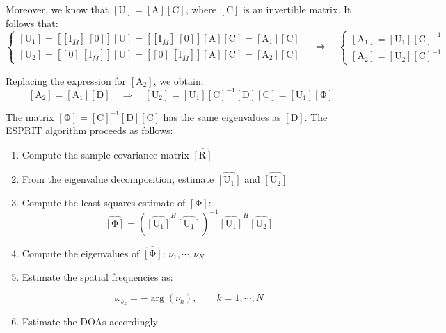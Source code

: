 Moreover, we know that $\left[ \mathrm{U} \right] = \left[ \mathrm{A} \right] \left[ \mathrm{C} \right]$, 
where $\left[ \mathrm{C} \right]$ is an invertible matrix.  
It follows that:
\[
\left\{
\begin{array}{l}
\left[ \mathrm{U}_1 \right] 
= \left[ \left[ \mathrm{I}_{\overline{M}} \right] \ \left[ 0 \right] \right] \left[ \mathrm{U} \right] 
= \left[ \left[ \mathrm{I}_{\overline{M}} \right] \ \left[ 0 \right] \right] \left[ \mathrm{A} \right] \left[ \mathrm{C} \right] 
= \left[ \mathrm{A}_1 \right] \left[ \mathrm{C} \right] \\
\left[ \mathrm{U}_2 \right] 
= \left[ \left[ 0 \right] \ \left[ \mathrm{I}_{\overline{M}} \right] \right] \left[ \mathrm{U} \right] 
= \left[ \left[ 0 \right] \ \left[ \mathrm{I}_{\overline{M}} \right] \right] \left[ \mathrm{A} \right] \left[ \mathrm{C} \right] 
= \left[ \mathrm{A}_2 \right] \left[ \mathrm{C} \right]
\end{array}
\right.
\quad \Rightarrow \quad
\left\{
\begin{array}{l}
\left[ \mathrm{A}_1 \right] = \left[ \mathrm{U}_1 \right] \left[ \mathrm{C} \right]^{-1} \\
\left[ \mathrm{A}_2 \right] = \left[ \mathrm{U}_2 \right] \left[ \mathrm{C} \right]^{-1}
\end{array}
\right.
\]

Replacing the expression for $\left[ \mathrm{A}_2 \right]$, we obtain:
\[
\left[ \mathrm{A}_2 \right] = \left[ \mathrm{A}_1 \right] \left[ \mathrm{D} \right]
\quad \Rightarrow \quad
\left[ \mathrm{U}_2 \right] 
= \left[ \mathrm{U}_1 \right] \left[ \mathrm{C} \right]^{-1} \left[ \mathrm{D} \right] \left[ \mathrm{C} \right] 
= \left[ \mathrm{U}_1 \right] \left[ \mathrm{\Phi} \right]
\]

The matrix $\left[ \mathrm{\Phi} \right] = \left[ \mathrm{C} \right]^{-1} \left[ \mathrm{D} \right] \left[ \mathrm{C} \right]$ has the same eigenvalues as $\left[ \mathrm{D} \right]$.
The ESPRIT algorithm proceeds as follows:
\begin{enumerate}
    \item Compute the sample covariance matrix $\hat{[ \mathrm{R} ]}$
    
    \item From the eigenvalue decomposition, estimate $\hat{[ \mathrm{U}_1 ]}$ and $\hat{[ \mathrm{U}_2 ]}$
    
    \item Compute the least-squares estimate of $[ \mathrm{\Phi} ]$:    
    \[
    \hat{[ \mathrm{\Phi} ]} = \left( \hat{[ \mathrm{U}_1 ]}^{H} \hat{[ \mathrm{U}_1 ]} \right)^{-1} \hat{[ \mathrm{U}_1 ]}^{H} \hat{[ \mathrm{U}_2 ]}
    \]
    
    \item Compute the eigenvalues of $\hat{[ \mathrm{\Phi} ]}$: $\nu_1, \cdots, \nu_N$
    
    \item Estimate the spatial frequencies as:
    
    \[
    \omega_{s_k} = - \arg(\nu_k), \qquad k = 1, \cdots, N
    \]
    
    \item Estimate the DOAs accordingly
\end{enumerate}

\clearpage
